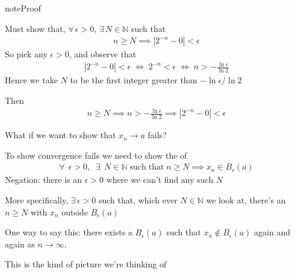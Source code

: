 \documentclass[letterpaper,10pt,english]{jupyterBook}
\begin{document}
\begin{sphinxadmonition}{note}{Proof}

\sphinxAtStartPar
Must show that, \(\forall \, \epsilon > 0\), \(\exists \, N \in \mathbb{N}\) such that
\begin{equation*}
\begin{split}
n \geq N
\implies
|2^{-n} - 0| < \epsilon
\end{split}
\end{equation*}
\sphinxAtStartPar
So pick any \(\epsilon > 0\), and observe that
\begin{equation*}
\begin{split}
|2^{-n} - 0| < \epsilon
\; \iff \;
2^{-n}  < \epsilon
\; \iff \;
n > - \frac{\ln \epsilon}{\ln 2}
\end{split}
\end{equation*}
\sphinxAtStartPar
Hence we take \(N\) to be the first integer greater than \(- \ln \epsilon /
\ln 2\)

\sphinxAtStartPar
Then
\begin{equation*}
\begin{split}
n \geq N 
\implies n > -\frac{\ln \epsilon}{\ln 2}
\implies |2^{-n} - 0| < \epsilon
\end{split}
\end{equation*}\end{sphinxadmonition}

\sphinxAtStartPar
What if we want to show that \(x_n \to a\) fails?

\sphinxAtStartPar
To show convergence fails we need to show the 
of
\begin{equation*}
\begin{split}
\forall \,\; \epsilon > 0, \;\; 
\exists \,\; N \in \mathbb{N} \;\mathrm{such\;that}\; n \geq N
\implies x_n \in B_{\epsilon}(a)
\end{split}
\end{equation*}
\sphinxAtStartPar
Negation: there is an \(\epsilon > 0\) where we can’t find any such \(N\)

\sphinxAtStartPar
More specifically, \(\exists \, \epsilon > 0\) such that, which ever \(N \in
\mathbb{N}\) we look at, there’s an \(n \geq N\) with \(x_n\) outside \(B_{\epsilon}(a)\)

\sphinxAtStartPar
One way to say this: there exists a \(B_\epsilon(a)\) such that \(x_n \notin B_\epsilon(a)\) again and again as \(n \to \infty\).

\sphinxAtStartPar
This is the kind of picture we’re thinking of
\end{document}

